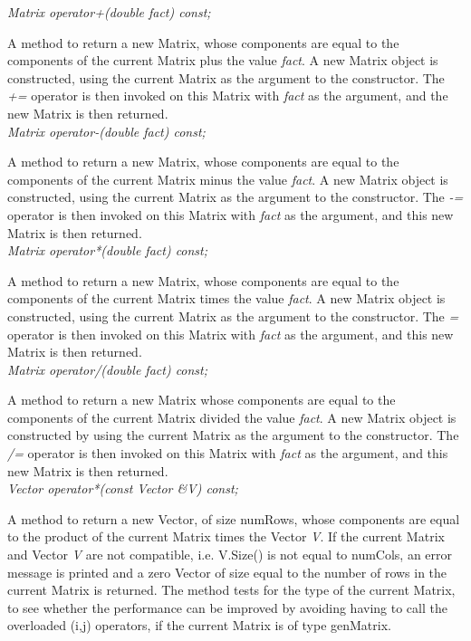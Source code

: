 {\em Matrix operator+(double fact) const;} 

A method to return a new Matrix, whose components are equal to the
components of the current Matrix plus the value {\em fact}. A new
Matrix object is constructed, using the current Matrix as the
argument to the constructor. The {\em +=} operator is then invoked 
on this Matrix with {\em fact} as the argument, and the new Matrix is
then returned. \\ 

{\em Matrix operator-(double fact) const;} 

A method to return a new Matrix, whose components are equal to the
components of the current Matrix minus the value {\em fact}. A new
Matrix object is constructed, using the current Matrix as the
argument to the constructor. The {\em -=} operator is then invoked 
on this Matrix with {\em fact} as the argument, and this new Matrix is
then returned. \\ 


{\em Matrix operator*(double fact) const;} 

A method to return a new Matrix, whose components are equal to the
components of the current Matrix times the value {\em fact}. A new
Matrix object is constructed, using the current Matrix as the
argument to the constructor. The {\em *=} operator is then invoked 
on this Matrix with {\em fact} as the argument, and this new Matrix is
then returned. \\ 

{\em Matrix operator/(double fact) const;} 

A method to return a new Matrix whose components are equal to the
components of the current Matrix divided the value {\em fact}. A new
Matrix object is constructed by using the current Matrix as the
argument to the constructor. The {\em /=} operator is then invoked 
on this Matrix with {\em fact} as the argument, and this new Matrix is
then returned. \\ 

{\em Vector operator*(const Vector \&V) const;} 

A method to return a new Vector, of size numRows, whose components are
equal to the product of the current Matrix times the Vector {\em
V}. If the current Matrix and Vector {\em V} are not compatible,
i.e. V.Size() is not equal to numCols, an error message is printed and 
a zero Vector of size equal to the number of rows in the current
Matrix is returned. The method tests for the type of the current
Matrix, to see whether the performance can be improved by avoiding
having to call the overloaded (i,j) operators, if the current Matrix
is of type genMatrix. \\ 

